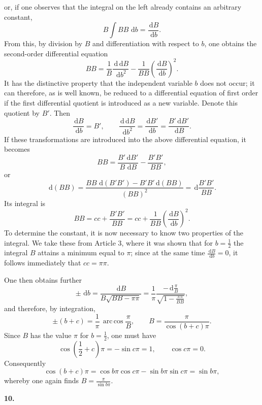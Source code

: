 \documentclass[11pt]{article}
\newcommand{\dd}{\,\mathrm d}
\newcommand{\art}[1]{\bigskip\begin{center}\large\bfseries #1.\end{center}\nopagebreak}
\newcommand{\arccosop}{\operatorname{arc\,cos}}
\begin{document}
or, if one observes that the integral on the left already contains an arbitrary constant,
\begin{equation}
B\int B B\,\dd b=\frac{\dd B}{\dd b}.
\tag{28}
\end{equation}
From this, by division by $B$ and differentiation with respect to $b$, one obtains the second-order differential equation
\[
B B=\frac1B\frac{\dd\dd B}{\dd b^2}
-\frac1{B B}\left(\frac{\dd B}{\dd b}\right)^2.
\]
It has the distinctive property that the independent variable $b$ does not occur; it can therefore, as is well known, be reduced to a differential equation of first order if the first differential quotient is introduced as a new variable. Denote this quotient by $B'$. Then
\[
\frac{\dd B}{\dd b}=B',\qquad
\frac{\dd\dd B}{\dd b^2}=\frac{\dd B'}{\dd b}
=\frac{B'\dd B'}{\dd B}.
\]
If these transformations are introduced into the above differential equation, it becomes
\[
B B=\frac{B'\dd B'}{B\,\dd B}-\frac{B'B'}{B B},
\]
or
\[
\dd(BB)=
\frac{BB\,\dd(B'B')-B'B'\dd(BB)}{(BB)^2}
=\dd\frac{B'B'}{BB}.
\]
Its integral is
\[
BB=cc+\frac{B'B'}{BB}
=cc+\frac1{BB}\left(\frac{\dd B}{\dd b}\right)^2.
\]
To determine the constant, it is now necessary to know two properties of the integral. We take these from Article 3, where it was shown that for $b=\frac12$ the integral $B$ attains a minimum equal to $\pi$; since at the same time $\frac{\dd B}{\dd b}=0$, it follows immediately that $cc=\pi\pi$.

One then obtains further
\[
\pm\,\dd b=
\frac{\dd B}{B\sqrt{BB-\pi\pi}}
=\frac1\pi
  \frac{-\dd\frac{\pi}{B}}
       {\sqrt{1-\frac{\pi\pi}{BB}}},
\]
and therefore, by integration,
\[
\pm(b+c)=\frac1\pi\,\arccosop\frac{\pi}{B},
\qquad
B=\frac{\pi}{\cos(b+c)\pi}.
\]
Since $B$ has the value $\pi$ for $b=\frac12$, one must have
\[
\cos\left(\frac12+c\right)\pi=-\sin c\pi=1,
\qquad \cos c\pi=0.
\]
Consequently
\[
\cos(b+c)\pi=\cos b\pi\cos c\pi-\sin b\pi\sin c\pi=\sin b\pi,
\]
whereby one again finds $B=\frac{\pi}{\sin b\pi}$.

\art{10}
\end{document}
